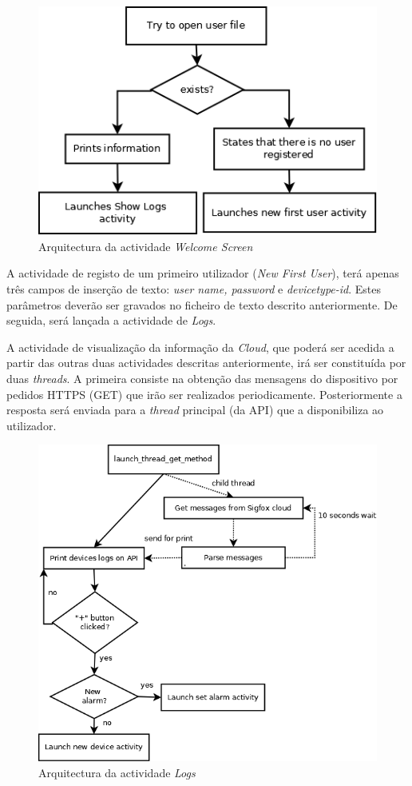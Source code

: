 \documentclass[a4paper]{article}
\begin{document}
\begin{figure}[hb]
  \centering
  \includegraphics[scale=0.40]{WelcomeScreen.png}
  \caption{Arquitectura da actividade \textit{Welcome Screen}}
  \label{fig:app_welcome}
\end{figure}

A actividade de registo de um primeiro utilizador (\textit{New First User}), terá apenas três campos de inserção de texto: \textit{user name, password} e \textit{devicetype-id}. Estes parâmetros deverão ser gravados no ficheiro de texto descrito anteriormente. De seguida, será lançada a actividade de \textit{Logs}.

A actividade de visualização da informação da \textit{Cloud}, que poderá ser acedida a partir das outras duas actividades descritas anteriormente, irá ser constituída por duas \textit{threads}. A primeira consiste na obtenção das mensagens do dispositivo por pedidos HTTPS (GET) que irão ser realizados periodicamente. Posteriormente a resposta será enviada para a \textit{thread} principal (da API) que a disponibiliza ao utilizador.

\begin{figure}[hb]
  \centering
  \includegraphics[scale=0.40]{ShowLogs.png}
  \caption{Arquitectura da actividade \textit{Logs}}
  \label{fig:app_logs}
\end{figure}
\end{document}
